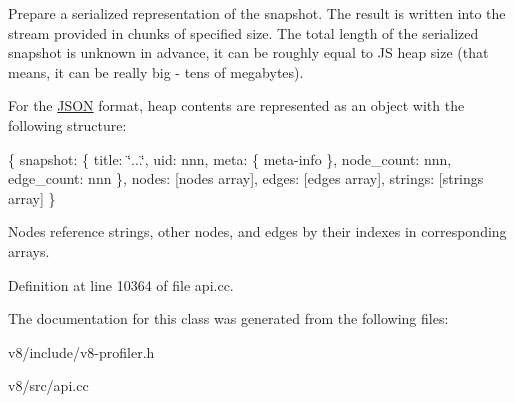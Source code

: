 Prepare a serialized representation of the snapshot. The result is written into the stream provided in chunks of specified size. The total length of the serialized snapshot is unknown in advance, it can be roughly equal to JS heap size (that means, it can be really big -\/ tens of megabytes).

For the \mbox{\hyperlink{classv8_1_1JSON}{J\+S\+ON}} format, heap contents are represented as an object with the following structure\+:

\{ snapshot\+: \{ title\+: \char`\"{}...\char`\"{}, uid\+: nnn, meta\+: \{ meta-\/info \}, node\+\_\+count\+: nnn, edge\+\_\+count\+: nnn \}, nodes\+: \mbox{[}nodes array\mbox{]}, edges\+: \mbox{[}edges array\mbox{]}, strings\+: \mbox{[}strings array\mbox{]} \}

Nodes reference strings, other nodes, and edges by their indexes in corresponding arrays. 

Definition at line 10364 of file api.\+cc.



The documentation for this class was generated from the following files\+:\begin{DoxyCompactItemize}
\item 
v8/include/v8-\/profiler.\+h\item 
v8/src/api.\+cc\end{DoxyCompactItemize}
